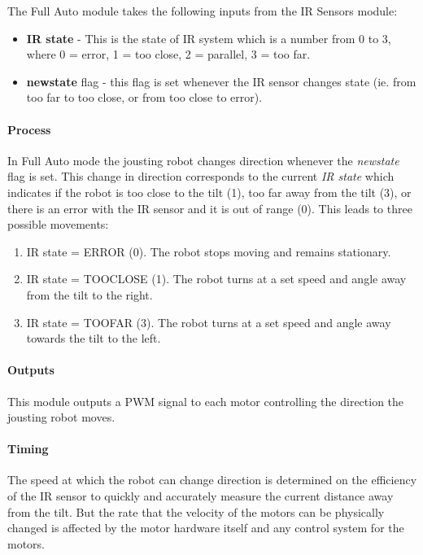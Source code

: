 \documentclass{article}
\begin{document}
	The Full Auto module takes the following inputs from the IR Sensors module:	
	\begin{itemize}
		\item \textbf{IR state} - This is the state of IR system which is a number from 0 to 3, where 0 = error, 1 = too close, 2 = parallel, 3 = too far.
		\item \textbf{newstate} flag - this flag is set whenever the IR sensor changes state (ie. from too far to too close, or from too close to error).
	\end{itemize} 
	
	\paragraph{Process}
	In Full Auto mode the jousting robot changes direction whenever the \textit{newstate} flag is set. This change in direction corresponds to the current \textit{IR state} which indicates if the robot is too close to the tilt (1), too far away from the tilt (3), or there is an error with the IR sensor and it is out of range (0).  This leads to three possible movements:
	
	\begin{enumerate}
		\item IR state = ERROR (0). The robot stops moving and remains stationary.
		\item IR state = TOO\textunderscore CLOSE (1). The robot turns at a set speed and angle away from the tilt to the right.
		\item IR state = TOO\textunderscore FAR (3). The robot turns at a set speed and angle away towards the tilt to the left.
	\end{enumerate}
	
	
	\paragraph{Outputs}
	This module outputs a PWM signal to each motor controlling the direction the jousting robot moves.
	
	\paragraph{Timing}
	The speed at which the robot can change direction is determined on the efficiency of the IR sensor to quickly and accurately measure the current distance away from the tilt. But the rate that the velocity of the motors can be physically changed is affected by the motor hardware itself and any control system for the motors.
	
\end{document}
